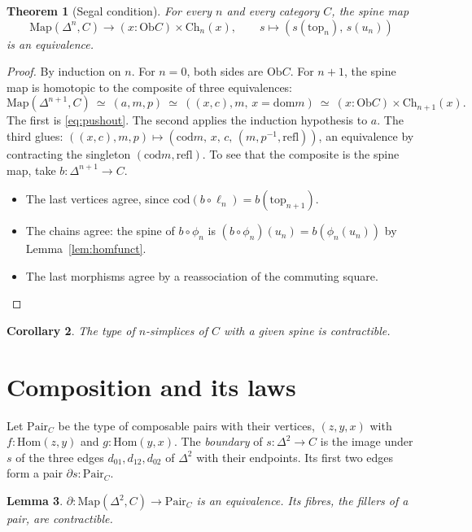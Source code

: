 \documentclass[11pt]{amsart}
\numberwithin{equation}{section}
\newtheorem{theorem}{Theorem}[section]
\newtheorem{lemma}[theorem]{Lemma}
\newtheorem{corollary}[theorem]{Corollary}
\theoremstyle{definition}
\theoremstyle{remark}
\newcommand{\Map}{\mathrm{Map}}
\newcommand{\Ob}{\mathrm{Ob}}
\newcommand{\Hom}{\mathrm{Hom}}
\newcommand{\Ch}{\mathrm{Ch}}
\newcommand{\dom}{\mathrm{dom}}
\newcommand{\cod}{\mathrm{cod}}
\begin{document}
\begin{theorem}[Segal condition]\label{thm:segal}
For every $n$ and every category $C$, the spine map
\[
\Map(\Delta^n,C)\longrightarrow (x:\Ob C)\times\Ch_n(x),\qquad
s\mapsto (s(\mathrm{top}_n),\,s(u_n))
\]
is an equivalence.
\end{theorem}

\begin{proof}
By induction on $n$. For $n=0$, both sides are $\Ob C$. For $n+1$, the
spine map is homotopic to the composite of three equivalences:
\[
\Map(\Delta^{n+1},C)\ \simeq\
(a,m,p)\ \simeq\ ((x,c),m,\,x=\dom m)\ \simeq\
(x:\Ob C)\times\Ch_{n+1}(x).
\]
The first is \eqref{eq:pushout}. The second applies the induction
hypothesis to $a$. The third glues: $((x,c),m,p)\mapsto(\cod m,\,x,\,c,\,
(m,p^{-1},\mathrm{refl}))$, an equivalence by contracting the
singleton $(\cod m,\mathrm{refl})$. To see that the composite is the
spine map, take $b:\Delta^{n+1}\to C$.
\begin{itemize}
\item The last vertices agree, since
  $\cod(b\circ\ell_n)=b(\mathrm{top}_{n+1})$.
\item The chains agree: the spine of $b\circ\phi_n$ is
  $(b\circ\phi_n)(u_n)=b(\phi_n(u_n))$ by Lemma~\ref{lem:homfunct}.
\item The last morphisms agree by a reassociation of the commuting
  square.\qedhere
\end{itemize}
\end{proof}

\begin{corollary}
The type of $n$-simplices of $C$ with a given spine is contractible.
\end{corollary}

\section{Composition and its laws}\label{sec:comp}

Let $\mathrm{Pair}_C$ be the type of composable pairs with their
vertices, $(z,y,x)$ with $f:\Hom(z,y)$ and $g:\Hom(y,x)$. The
\emph{boundary} of $s:\Delta^2\to C$ is the image under $s$ of the three
edges $d_{01},d_{12},d_{02}$ of $\Delta^2$ with their endpoints. Its
first two edges form a pair $\partial s:\mathrm{Pair}_C$.

\begin{lemma}\label{lem:seg2}
$\partial:\Map(\Delta^2,C)\to\mathrm{Pair}_C$ is an equivalence. Its
fibres, the \emph{fillers} of a pair, are contractible.
\end{lemma}
\end{document}
